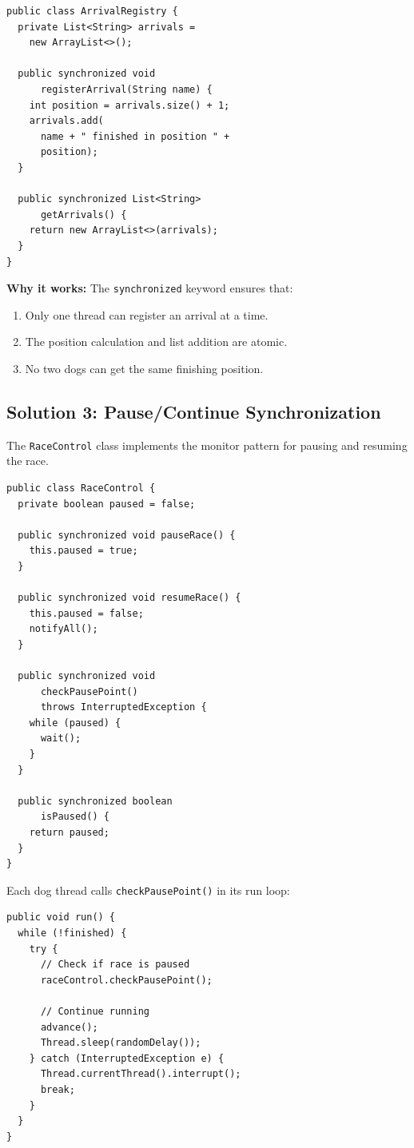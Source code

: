 \documentclass[10pt,a4paper,twocolumn]{article}
\begin{document}
\begin{lstlisting}[caption={ArrivalRegistry.java - Synchronized Method}]
public class ArrivalRegistry {
  private List<String> arrivals = 
    new ArrayList<>();
    
  public synchronized void 
      registerArrival(String name) {
    int position = arrivals.size() + 1;
    arrivals.add(
      name + " finished in position " + 
      position);
  }
  
  public synchronized List<String>
      getArrivals() {
    return new ArrayList<>(arrivals);
  }
}
\end{lstlisting}

\textbf{Why it works:} The \texttt{synchronized} keyword ensures that:
\begin{enumerate}
    \item Only one thread can register an arrival at a time.
    \item The position calculation and list addition are atomic.
    \item No two dogs can get the same finishing position.
\end{enumerate}

\subsection{Solution 3: Pause/Continue Synchronization}

The \texttt{RaceControl} class implements the monitor pattern for pausing and resuming the race.

\begin{lstlisting}[caption={RaceControl.java - Full Implementation}]
public class RaceControl {
  private boolean paused = false;
  
  public synchronized void pauseRace() {
    this.paused = true;
  }
  
  public synchronized void resumeRace() {
    this.paused = false;
    notifyAll();
  }
  
  public synchronized void 
      checkPausePoint() 
      throws InterruptedException {
    while (paused) {
      wait();
    }
  }
  
  public synchronized boolean
      isPaused() {
    return paused;
  }
}
\end{lstlisting}

Each dog thread calls \texttt{checkPausePoint()} in its run loop:

\begin{lstlisting}[caption={Galgo.java - Pause Check Integration}]
public void run() {
  while (!finished) {
    try {
      // Check if race is paused
      raceControl.checkPausePoint();
      
      // Continue running
      advance();
      Thread.sleep(randomDelay());
    } catch (InterruptedException e) {
      Thread.currentThread().interrupt();
      break;
    }
  }
}
\end{lstlisting}
\end{document}

